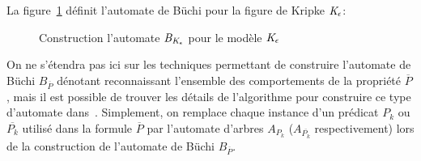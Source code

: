 \begin{example}
  La figure~\ref{fig5} définit l'automate de Büchi pour la figure de Kripke $\mathit K_\epsilon$:
  \begin{figure}[ht!]
    \begin{minipage}{0.5\linewidth}
      \begin{center}
      \end{center}
    \end{minipage}
    \begin{minipage}{0.5\linewidth}
      \begin{center}
      \end{center}
    \end{minipage}
    \caption{\footnotesize Construction l'automate $\mathit B_{\mathit K_\epsilon}$ pour le modèle $\mathit K_\epsilon$}
    \label{fig5}
  \end{figure}
\end{example}

On ne s'étendra pas ici sur les techniques permettant de construire l'automate de Büchi $B_{\overline{P}}$ dénotant
reconnaissant l'ensemble des comportements de la propriété $\overline{P}$, 
mais il est possible de trouver les détails de l'algorithme
pour construire ce type d'automate dans~\cite{DBLP:conf/pstv/GerthPVW95}. Simplement, on remplace chaque instance 
d'un prédicat $P_k$ ou $\overline{P_k}$ utilisé dans la formule $\overline{P}$ par l'automate d'arbres
$A_{P_k}$ ($A_{\overline{P_k}}$ respectivement) lors de la construction de l'automate de Büchi $B_{\overline{P}}$.



